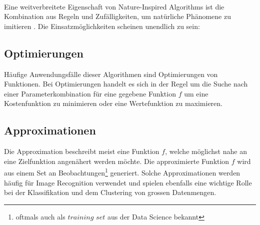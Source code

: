 \cite[Kap. 1.2]{Bro11} \\

Eine weitverbreitete Eigenschaft von Nature-Inspired Algorithms ist die Kombination aus Regeln und Zufälligkeiten, um
natürliche Phänomene zu imitieren \cite{NH15}. Die Einsatzmöglichkeiten scheinen unendlich zu sein: 


\subsection{Optimierungen}
Häufige Anwendungsfälle dieser Algorithmen sind Optimierungen von Funktionen. Bei Optimierungen
handelt es sich in der Regel um die Suche nach einer Parameterkombination für eine gegebene Funktion $f$ um eine
Kostenfunktion zu minimieren oder eine Wertefunktion zu maximieren.

\subsection{Approximationen}
Die Approximation beschreibt meist eine Funktion $f$, welche möglichst nahe an eine Zielfunktion angenähert werden
möchte. Die approximierte Funktion $f$ wird aus einem Set an Beobachtungen\footnote{oftmals auch als $training$ $set$ aus
der Data Science bekannt} generiert. Solche Approximationen werden häufig für Image Recognition verwendet
und spielen ebenfalls eine wichtige Rolle bei der Klassifikation und dem Clustering von grossen Datenmengen.